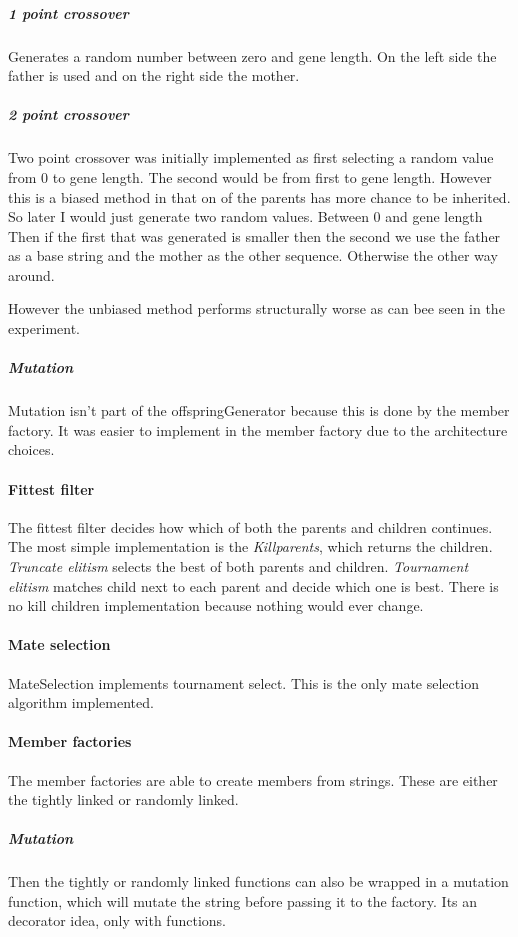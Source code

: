 \documentclass{article}
\begin{document}
\begin{empfile}
\subparagraph{1 point crossover}
Generates a random number between zero and gene length. On the left side 
the father is used and on the right side the mother.

\subparagraph{2 point crossover}
Two point crossover was initially implemented
as first selecting a random value from 0 to gene length. The second would
be from first to gene length. However this is a biased method in that
on of the parents has more chance to be inherited. So
later I would just generate two random values. Between 0 and gene length
Then if the first that was generated is smaller then the second we use
the father as a base string and the mother as the other sequence. Otherwise
the other way around.

However the unbiased method performs structurally worse as can bee seen
in the experiment.

\subparagraph{Mutation}
Mutation isn't part of the offspringGenerator
because this is done by the member factory. It was easier to implement
in the member factory due to the architecture choices.

\paragraph{Fittest filter} The fittest filter decides how which of both
the parents and children continues.
The most simple implementation is the \emph{Killparents}, which
returns the children. \emph{Truncate elitism} selects the best of both parents
and children. \emph{Tournament elitism} matches child next to each parent
and decide which one is best. There is no kill children implementation
because nothing would ever change.

\paragraph{Mate selection} MateSelection implements tournament select.
This is the only mate selection algorithm implemented.

\paragraph{Member factories} The member factories are able to create
members from strings. These are either the tightly linked or randomly
linked. 
\subparagraph{Mutation} Then the tightly or randomly linked
functions can also be wrapped in a mutation function,
which will mutate the string before passing it to the factory.
Its an decorator idea, only with functions.


\end{empfile}
\end{document}
